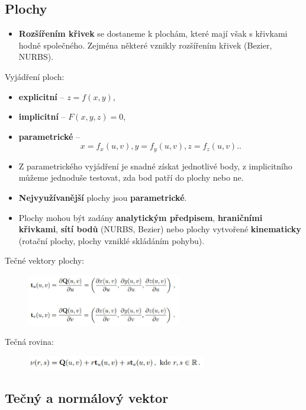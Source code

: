 \subsection{Plochy}
\begin{itemize}
	\item \textbf{Rozšířením křivek} se dostaneme k plochám, které mají však s křivkami hodně společného. Zejména některé vznikly rozšířením křivek (Bezier, NURBS).
\end{itemize}
Vyjádření ploch:
\begin{itemize}
	\item \textbf{explicitní} -- $z = f(x, y)$,
	\item \textbf{implicitní} -- $F(x, y, z) = 0$,
	\item \textbf{parametrické} -- 		
	\begin{equation*}
				x = f_x(u, v), y = f_y(u, v), z = f_z(u, v). .
	\end{equation*}
\end{itemize}
\begin{itemize}
	\item Z parametrického vyjádření je snadné získat jednotlivé body, z implicitního můžeme jednoduše testovat, zda bod patří do plochy nebo ne. 
	\item \textbf{Nejvyužívanější} plochy jsou \textbf{parametrické}. 
	\item Plochy mohou být zadány \textbf{analytickým předpisem}, \textbf{hraničními křivkami}, \textbf{sítí bodů} (NURBS, Bezier) nebo plochy vytvořené \textbf{kinematicky} (rotační plochy, plochy vzniklé skládáním pohybu).
\end{itemize}
Tečné vektory plochy:
\begin{figure}[H]
\centering
\includegraphics[width=0.6\textwidth]{assets/3_tecne_vektory_plochy}
\end{figure}
Tečná rovina:
\begin{figure}[H]
\centering
\includegraphics[width=0.7\textwidth]{assets/3_tecna_rovina}
\end{figure}

\subsection{Tečný a normálový vektor}
